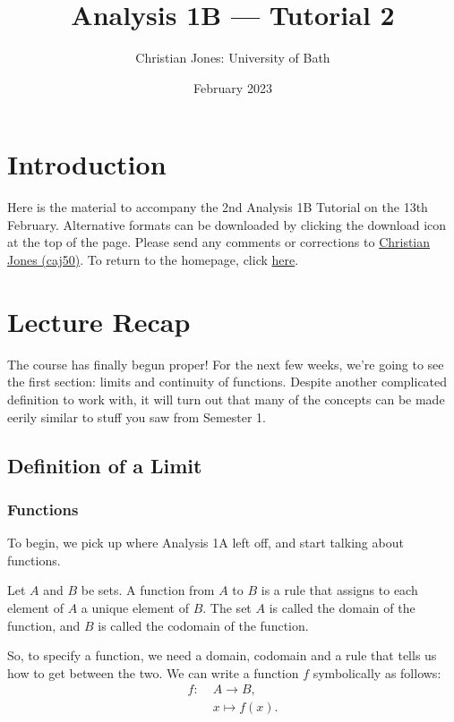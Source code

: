 \documentclass[
  10pt,
  a4paper]{article}
\title{Analysis 1B --- Tutorial 2}
\author{Christian Jones: University of Bath}
\date{February 2023}
\theoremstyle{plain}
\theoremstyle{definition}
\theoremstyle{plain}
\theoremstyle{plain}
\theoremstyle{plain}
\theoremstyle{plain}
\theoremstyle{definition}
\theoremstyle{definition}
\theoremstyle{remark}
\theoremstyle{remark}
\let\BeginKnitrBlock\begin \let\EndKnitrBlock\end
\begin{document}
\maketitle

{
\setcounter{tocdepth}{2}
\tableofcontents
}
\newpage
{}

\hypertarget{introduction}{%
\section*{Introduction}\label{introduction}}

Here is the material to accompany the 2nd Analysis 1B Tutorial on the 13th February. Alternative formats can be downloaded by clicking the download icon at the top of the page. Please send any comments or corrections to \href{mailto:caj50@bath.ac.uk}{Christian Jones (caj50)}. To return to the homepage, click \href{http://caj50.github.io/tutoring.html}{here}.

\hypertarget{lecture-recap}{%
\section{Lecture Recap}\label{lecture-recap}}

The course has finally begun proper! For the next few weeks, we're going to see the first section: limits and continuity of functions. Despite another complicated definition to work with, it will turn out that many of the concepts can be made eerily similar to stuff you saw from Semester 1.

\hypertarget{definition-of-a-limit}{%
\subsection{Definition of a Limit}\label{definition-of-a-limit}}

\hypertarget{functions}{%
\subsubsection{Functions}\label{functions}}

To begin, we pick up where Analysis 1A left off, and start talking about functions.
\BeginKnitrBlock{definition}[Function]
{\label{def:def1} }Let \(A\) and \(B\) be sets. A function from \(A\) to \(B\) is a rule that assigns to each element of \(A\) a unique element of \(B\). The set \(A\) is called the domain of the function, and \(B\) is called the codomain of the function.
\EndKnitrBlock{definition}
So, to specify a function, we need a domain, codomain and a rule that tells us how to get between the two. We can write a function \(f\) symbolically as follows:
\begin{align*}
f:\; &A \longrightarrow B,\\
&x \longmapsto f(x).
\end{align*}
\end{document}
